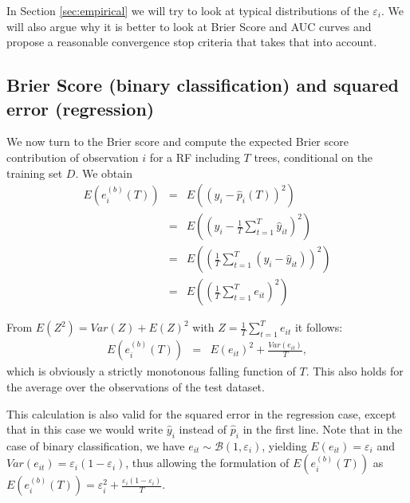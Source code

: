 \documentclass[paper=a4
               ,12pt
               ,DIV=12
               ,parskip=half
               ,titlepage=on
               ,headinclude 
               ,footinclude
               ,headsepline
               ,footsepline         %
               ,ilines 
               ]{scrartcl}
\begin{document}
In Section \ref{sec:empirical} we will try to look at typical distributions of the $\varepsilon_i$. We will also argue why it is better to look at Brier Score and AUC curves 
and propose a reasonable convergence stop criteria that takes that into account.




\subsection{Brier Score (binary classification) and squared error (regression)}
We now turn to the Brier score and compute the expected Brier score contribution of observation $i$ for a RF including $T$ trees, conditional on the training set $D$. We obtain
\begin{eqnarray*}
 E(e_i^{(b)}(T)) & = & E((y_i - \hat{p}_i(T) ) ^2) \\
                    & = & E((y_i-\frac{1}{T}\sum_{t=1}^T\hat{y}_{it})^2) \\
                    & = & E((\frac{1}{T}\sum_{t=1}^T(y_i-\hat{y}_{it}))^2) \\
                    & = & E((\frac{1}{T}\sum_{t=1}^T e_{it})^2)
\end{eqnarray*} 


From $E(Z^2) = Var(Z)+E(Z)^2$ with $Z=\frac{1}{T}\sum_{t=1}^T e_{it}$  it follows:
\begin{eqnarray*}
 E(e_i^{(b)}(T)) & = & E(e_{it})^2+\frac{Var(e_{it})}{T},
\end{eqnarray*} 
which is obviously a strictly monotonous falling function of $T$. This also holds for the average over the observations of the test dataset.

This calculation is also valid for the squared error in the regression case, except that in this case we would write $\hat{y}_{i}$ instead of $\hat{p}_{i}$ in the first line. Note that in the case of binary classification, we have  $e_{it}\sim\mathcal{B}(1,\varepsilon_i)$, yielding $E(e_{it})=\varepsilon_i$ and $Var(e_{it})=\varepsilon_i(1-\varepsilon_i)$, thus allowing the formulation of  $E(e_i^{(b)}(T))$ as $E(e_i^{(b)}(T))=\varepsilon_i^2+\frac{\varepsilon_i(1-\varepsilon_i)}{T}$.
\end{document}
